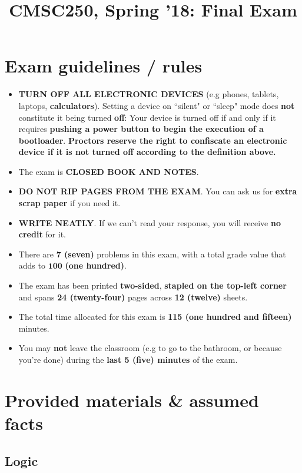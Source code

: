 \documentclass[letterpaper,12pt]{article}
\title{CMSC250, Spring '18: Final Exam}
\begin{document}

\vspace{-.3in}

\section*{Exam guidelines / rules}
\label{sec:guidelines}
\begin{itemize}
	
	\item \textbf{TURN OFF ALL ELECTRONIC DEVICES} (e.g phones, tablets, laptops, {\bf calculators}). Setting a device on ``silent" or ``sleep" mode does \textbf{not} constitute it being turned \textbf{off}: Your device is turned off if and only if it requires \textbf{pushing a power button to begin the execution of a bootloader}. \textbf{Proctors reserve the right to confiscate an electronic device if it is not turned off according to the definition above.}
		\item The exam is {\bf CLOSED BOOK AND NOTES}.
		\item {\bf DO NOT RIP PAGES FROM THE EXAM}. You can ask us for \textbf{extra scrap paper} if you need it.
	\item {\bf WRITE NEATLY}. If we can't read your response, you will receive \textbf{no credit} for it. 
	\item There are {\bf 7 (seven)} problems in this exam, with a total grade value that adds to $\mathbf{100}$ \textbf{(one hundred)}.
	\item The exam has been printed \textbf{two-sided}, \textbf{stapled on the top-left corner} and spans {\bf 24 (twenty-four)} pages across {\bf 12 (twelve)} sheets. 
	\item The total time allocated for this exam is \textbf{115 (one hundred and fifteen)} minutes.
	\item You may \textbf{not} leave the classroom (e.g to go to the bathroom, or because you're done) during the \textbf{last 5 (five) minutes} of the exam.
\end{itemize}
 \vspace{-.2in}
\section*{Provided materials \& assumed facts}
 \vspace{-.1in}
\subsection*{Logic}
\label{subsec:logic}
\end{document}
